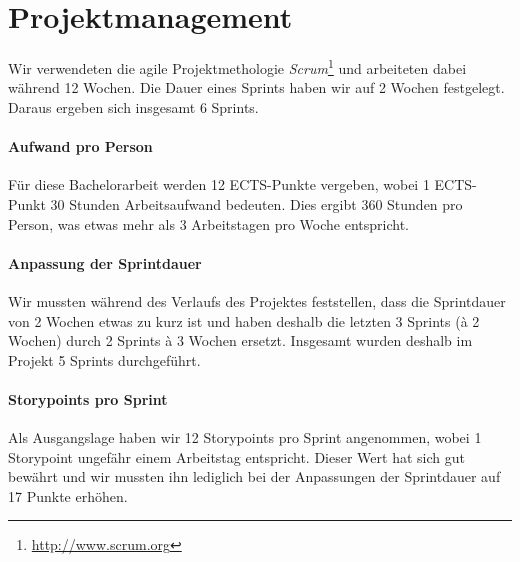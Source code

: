 \chapter{Projektmanagement}
\label{projektmanagement}

Wir verwendeten die agile Projektmethologie \emph{Scrum}\footnote{\url{http://www.scrum.org}} und arbeiteten dabei während 12 Wochen.
Die Dauer eines Sprints haben wir auf 2 Wochen festgelegt. Daraus ergeben sich insgesamt 6 Sprints.

\subsubsection{Aufwand pro Person}
Für diese Bachelorarbeit werden 12 ECTS-Punkte vergeben, wobei 1 ECTS-Punkt 30 Stunden Arbeitsaufwand bedeuten.
Dies ergibt 360 Stunden pro Person, was etwas mehr als 3 Arbeitstagen pro Woche entspricht.

\subsubsection{Anpassung der Sprintdauer}
Wir mussten während des Verlaufs des Projektes feststellen, dass die Sprintdauer von 2 Wochen etwas zu kurz ist und haben deshalb die letzten 3 Sprints (à 2 Wochen) durch 2 Sprints à 3 Wochen ersetzt. Insgesamt wurden deshalb im Projekt 5 Sprints durchgeführt. 

\subsubsection{Storypoints pro Sprint}
Als Ausgangslage haben wir 12 Storypoints pro Sprint angenommen, wobei 1 Storypoint ungefähr einem Arbeitstag entspricht. 
Dieser Wert hat sich gut bewährt und wir mussten ihn lediglich bei der Anpassungen der Sprintdauer auf 17 Punkte erhöhen.

